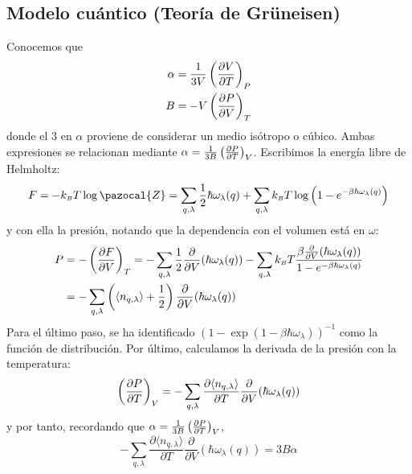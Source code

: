 \subsection{Modelo cuántico (Teoría de Grüneisen)}
Conocemos que
\begin{align}
  \alpha &= \frac{1}{3V} \left( \frac{\partial V}{\partial T} \right)_{P} \\
  B &= -V \left( \frac{\partial P}{\partial V} \right)_{T}
\end{align}
donde el $3$ en $\alpha$ proviene de considerar un medio isótropo o
cúbico. Ambas expresiones se relacionan mediante
$\alpha = \frac{1}{3B} \left( \frac{\partial P}{\partial T} \right)_{V}$. Escribimos la energía libre
de Helmholtz:
\begin{equation}
  F = - \kb  T \log \pazocal{Z} = \sum_{q,\lambda}^{ } \frac{1}{2}
  \hbar \omega_\lambda (q) + \sum_{q,\lambda}^{ } \kb  T \log \left(
    1-e^{-\beta \hbar \omega_\lambda(q)} \right)
\end{equation}
y con ella la presión, notando que la dependencia con el volumen está
en $\omega$:
\begin{equation}
\begin{split}
  P &= - \left( \frac{\partial F}{\partial V} \right)_{T} = -\sum_{q, \lambda}^{} \frac{1}{2}
  \frac{\partial}{\partial V}(\hbar \omega_\lambda (q)) -
  \sum_{q,\lambda}^{ }k_{\scriptscriptstyle{B}}  T \frac{\beta \frac{\partial}{\partial V}
    (\hbar \omega_\lambda (q))}{1-e^{-\beta \hbar\omega_\lambda (q)}}
  \\
    &= - \sum_{q,\lambda}^{ } \left( \langle n_{q,\lambda} \rangle +
      \frac{1}{2}\right) \frac{\partial}{\partial V} (\hbar
      \omega_\lambda (q))
\end{split}
\end{equation}
Para el último paso, se ha identificado
$(1-\exp( 1 -\beta \hbar \omega_\lambda))^{-1}$ como la función de
distribución. Por último, calculamos la derivada de la presión con la
temperatura:
\begin{equation}
  \left( \frac{\partial P}{\partial T} \right)_{V} = - \sum_{q,\lambda} \frac{\partial \langle
    n_{q,\lambda}\rangle}{\partial T} \frac{\partial}{\partial V} (
  \hbar \omega_\lambda ( q))
\end{equation}
y por tanto, recordando que $\alpha = \frac{1}{3B} \left( \frac{\partial P}{\partial T} \right)_{V}$,
\begin{equation}
  - \sum_{q,\lambda} \frac{\partial \langle
    n_{q,\lambda}\rangle}{\partial T} \frac{\partial}{\partial V} ( \hbar \omega_\lambda ( q)) = 3B \alpha
\end{equation}

